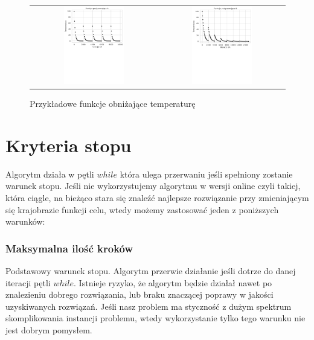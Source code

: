 \begin{figure}[!h]
\begin{tabular}{ c c }
	\includegraphics[width=0.5\textwidth]{gfx/temp_heater_a.pdf} & \includegraphics[width=0.5\textwidth]{gfx/temp_heater_b.pdf}
\end{tabular}
	\caption{Przykładowe funkcje obniżające temperaturę}
	\label{example-cooling-functions}
\end{figure}
\newpage
\section{Kryteria stopu}
\label{sec:stop-criteria}
Algorytm działa w pętli $while$ która ulega przerwaniu jeśli spełniony zostanie
warunek stopu. Jeśli nie wykorzystujemy algorytmu w wersji online czyli takiej,
która ciągle, na bieżąco stara się znaleźć najlepsze rozwiązanie przy
zmieniającym się krajobrazie funkcji celu, wtedy możemy zastosować jeden z
poniższych warunków:

\subsubsection{Maksymalna ilość kroków} 
Podstawowy warunek stopu. Algorytm przerwie działanie jeśli dotrze do danej
iteracji pętli $while$. Istnieje ryzyko, że algorytm będzie działał nawet po
znalezieniu dobrego rozwiązania, lub braku znaczącej poprawy w jakości
uzyskiwanych rozwiązań. Jeśli nasz problem ma styczność z dużym spektrum
skomplikowania instancji problemu, wtedy wykorzystanie tylko tego warunku nie jest
dobrym pomysłem.

